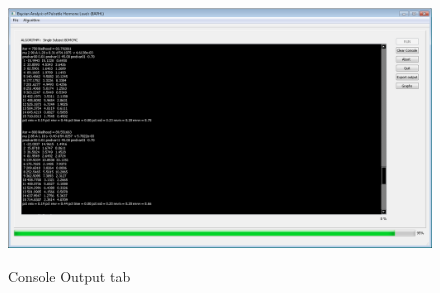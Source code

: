 \documentclass[11pt]{book}
\begin{document}
\begin{figure}
  \centering
  \includegraphics[width=\textwidth]{consoleoutput.PNG}\\
  \caption{Console Output tab}\label{console}
\end{figure}
\end{document}
